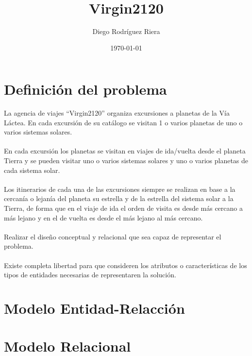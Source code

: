\documentclass[a4paper,10pt]{article}
\title{Virgin2120}
\author{Diego Rodríguez Riera}
\date{\today}
\begin{document}
\maketitle
\pagebreak
\tableofcontents
\pagebreak

\section{Definición del problema}
\paragraph{}
La agencia de viajes “Virgin2120” organiza excursiones a planetas de la Vía Láctea. En cada excursión de su catálogo se visitan 1 o varios planetas de uno o varios sistemas solares.
\paragraph{}
En cada excursión los planetas se visitan en viajes de ida/vuelta desde el planeta Tierra y se pueden visitar uno o varios sistemas solares y uno o varios planetas de cada sistema solar.
\paragraph{}
Los itinerarios de cada una de las excursiones siempre se realizan en base a la cercanía o lejanía del planeta su estrella y de la estrella del sistema solar a la Tierra, de forma que en el viaje de ida el orden de visita es desde más cercano a más lejano y en el de vuelta es desde el más lejano al más cercano.
\paragraph{}
Realizar el diseño conceptual y relacional que sea capaz de representar el problema.
\paragraph{}
Existe completa libertad para que consideren los atributos o características de los tipos de entidades necesarias de representaren la solución.
\pagebreak

\section{Modelo Entidad-Relacción}
\scalebox{0.44}{}


\pagebreak

\section{Modelo Relacional}
\end{document}
